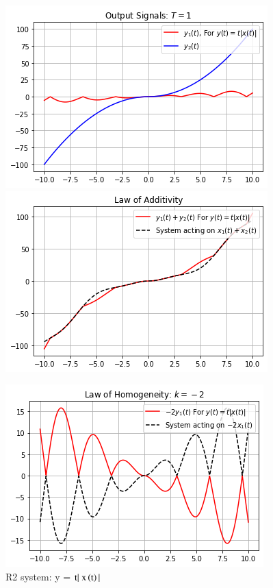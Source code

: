 \documentclass[journal,12pt,twocolumn]{IEEEtran}
\begin{document}
\begin{figure}[h]
\caption{R2 system: y = $\text{t}|\; \text{x}\left(\text{t}\right)|$}
\includegraphics[width = \columnwidth]{y2}
\includegraphics[width = \columnwidth]{y2_p}

\includegraphics[width = \columnwidth]{y2_h}


\end{figure}
\end{document}
